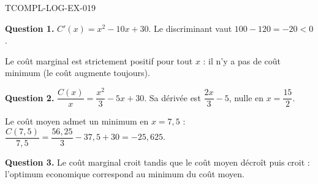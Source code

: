 \begin{corrige}{TCOMPL-LOG-EX-019}

\textbf{Question 1.} $C'(x) = x^2 - 10x + 30$. Le discriminant vaut $100 - 120 = -20 < 0$.


Le coût marginal est strictement positif pour tout $x$ : il n'y a pas de coût minimum (le coût augmente toujours).

\textbf{Question 2.} $\dfrac{C(x)}{x} = \dfrac{x^2}{3} - 5x + 30$. Sa dérivée est $\dfrac{2x}{3} - 5$, nulle en $x = \dfrac{15}{2}$.

Le coût moyen admet un minimum en $x = 7{,}5$ : $\dfrac{C(7{,}5)}{7{,}5} = \dfrac{56{,}25}{3} - 37{,}5 + 30 = -25{,}625$.

\textbf{Question 3.} Le coût marginal croit tandis que le coût moyen décroît puis croit : l'optimum economique correspond au minimum du coût moyen.

\end{corrige}
